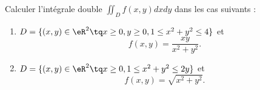 
\begin{exercice}\label{exoOutilsMath-0107}

    Calculer l'intégrale double $\iint_Df(x,y)dxdy$ dans les cas suivants :
    \begin{enumerate}
        \item
            $D=\{ (x,y)\in\eR^2\tq x\geq 0,y\geq 0,1\leq x^2+y^2\leq 4 \}$ et
            \begin{equation}
                f(x,y)=\frac{ xy }{ x^2+y^2 }.
            \end{equation}
        \item
            $D=\{ (x,y)\in\eR^2\tq x\geq 0, 1\leq x^2+y^2\leq 2y \}$ et
            \begin{equation}
                f(x,y)=\sqrt{x^2+y^2}.
            \end{equation}
    \end{enumerate}

\end{exercice}
